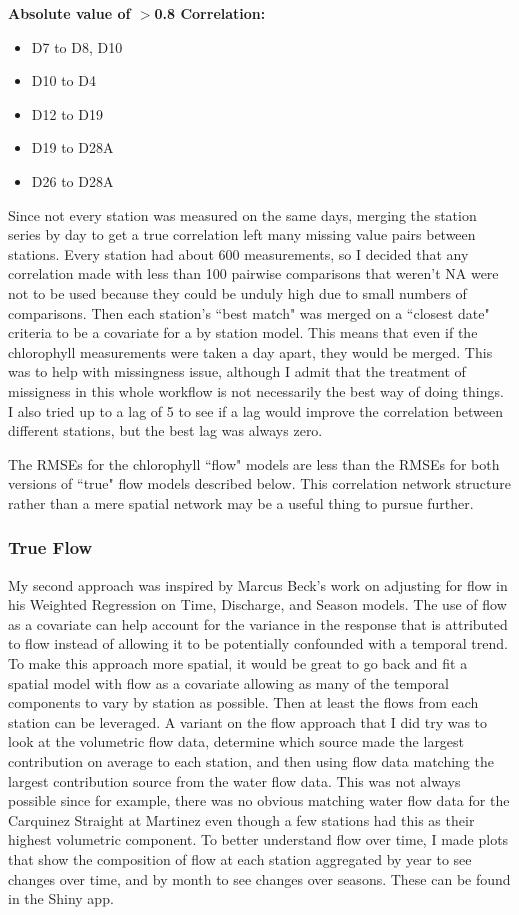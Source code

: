 \documentclass[12pt]{amsart}
\begin{document}
\textbf{Absolute value of $>$0.8 Correlation:}
\begin{itemize}
\item D7 to D8, D10
\item D10 to D4
\item D12 to D19
\item D19 to D28A
\item D26 to D28A
\end{itemize}

Since not every station was measured on the same days, merging the station series by day to get a true correlation left many missing value pairs between stations. Every station had about 600 measurements, so I decided that any correlation made with less than 100 pairwise comparisons that weren't NA were not to be used because they could be unduly high due to small numbers of comparisons. Then each station's ``best match" was merged on a ``closest date" criteria to be a covariate for a by station model. This means that even if the chlorophyll measurements were taken a day apart, they would be merged. This was to help with missingness issue, although I admit that the treatment of missigness in this whole workflow is not necessarily the best way of doing things. I also tried up to a lag of 5 to see if a lag would improve the correlation between different stations, but the best lag was always zero. 


The RMSEs for the chlorophyll ``flow" models are less than the RMSEs for both versions of ``true" flow models described below. This correlation network structure rather than a mere spatial network may be a useful thing to pursue further.

\subsubsection{True Flow}

My second approach was inspired by Marcus Beck's work on adjusting for flow in his Weighted Regression on Time, Discharge, and Season models. The use of flow as a covariate can help account for the variance in the response that is attributed to flow instead of allowing it to be potentially confounded with a temporal trend. To make this approach more spatial, it would be great to go back and fit a spatial model with flow as a covariate allowing as many of the temporal components to vary by station as possible. Then at least the flows from each station can be leveraged. A variant on the flow approach that I did try was to look at the volumetric flow data, determine which source made the largest contribution on average to each station, and then using flow data matching the largest contribution source from the water flow data. This was not always possible since for example, there was no obvious matching water flow data for the Carquinez Straight at Martinez even though a few stations had this as their highest volumetric component. To better understand flow over time, I  made plots that show the composition of flow at each station aggregated by year to see changes over time, and by month to see changes over seasons. These can be found in the Shiny app.
\end{document}
